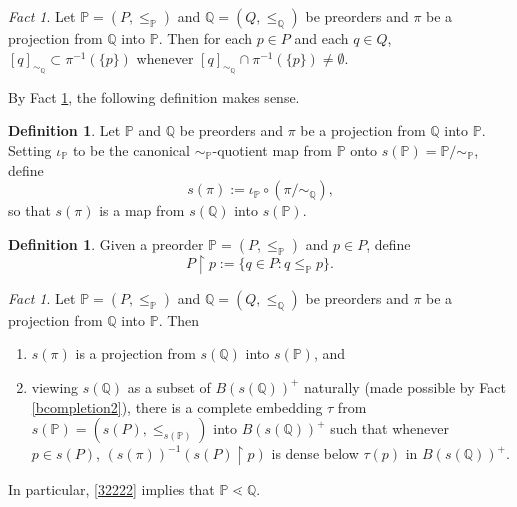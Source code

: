 \documentclass[12pt, twoside]{memoir}
\numberwithin{equation}{section}
\theoremstyle{definition}
\newtheorem{defi}[thm]{Definition}
\theoremstyle{remark}
\newtheorem{fact}[thm]{Fact}
\theoremstyle{definition}
\theoremstyle{definition}
\theoremstyle{definition}
\theoremstyle{remark}
\begin{document}
\begin{fact}\label{fact3217}
Let $\mathbb{P} = (P, \leq_{\mathbb{P}})$ and $\mathbb{Q} = (Q, \leq_{\mathbb{Q}})$ be preorders and $\pi$ be a projection from $\mathbb{Q}$ into $\mathbb{P}$. Then for each $p \in P$ and each $q \in Q$, $[q]_{\sim_{\mathbb{Q}}} \subset \pi^{-1}(\{p\})$ whenever $[q]_{\sim_{\mathbb{Q}}} \cap \pi^{-1}(\{p\}) \neq \emptyset$.
\end{fact}

By Fact \ref{fact3217}, the following definition makes sense.

\begin{defi}
Let $\mathbb{P}$ and $\mathbb{Q}$ be preorders and $\pi$ be a projection from $\mathbb{Q}$ into $\mathbb{P}$. Setting $\iota_{\mathbb{P}}$ to be the canonical $\sim_{\mathbb{P}}$-quotient map from $\mathbb{P}$ onto $s(\mathbb{P}) = \mathbb{P} / \sim_{\mathbb{P}}$, define
\begin{equation*}
    s(\pi) := \iota_{\mathbb{P}} \circ (\pi / \sim_{\mathbb{Q}}) \text{,}
\end{equation*}
so that $s(\pi)$ is a map from $s(\mathbb{Q})$ into $s(\mathbb{P})$.
\end{defi}

\begin{defi}
Given a preorder $\mathbb{P} = (P, \leq_{\mathbb{P}})$ and $p \in P$, define
\begin{equation*}
    P \restriction p := \{q \in P : q \leq_{\mathbb{P}} p\} \text{.}
\end{equation*}
\end{defi}

\begin{fact}\label{fact3222}
Let $\mathbb{P} = (P, \leq_{\mathbb{P}})$ and $\mathbb{Q} = (Q, \leq_{\mathbb{Q}})$ be preorders and $\pi$ be a projection from $\mathbb{Q}$ into $\mathbb{P}$. Then
\begin{enumerate}[label=(\arabic*)]
    \item $s(\pi)$ is a projection from $s(\mathbb{Q})$ into $s(\mathbb{P})$, and
    \item\label{32222} viewing $s(\mathbb{Q})$ as a subset of $B(s(\mathbb{Q}))^+$ naturally (made possible by Fact \ref{bcompletion2}), there is a complete embedding $\tau$ from $s(\mathbb{P}) = (s(P), \leq_{s(\mathbb{P})})$ into $B(s(\mathbb{Q}))^+$ such that whenever $p \in s(P)$, $(s(\pi))^{-1}(s(P) \restriction p)$ is dense below $\tau(p)$ in $B(s(\mathbb{Q}))^+$.
\end{enumerate}
In particular, \ref{32222} implies that $\mathbb{P} \lessdot \mathbb{Q}$.
\end{fact}
\end{document}

